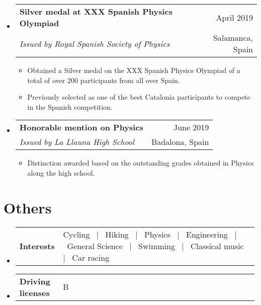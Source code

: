 \documentclass[a4paper,11pt]{article}
\makeatletter
\newcommand{\resumeSectionTypeOne}[2]{
  \item\begin{tabular*}{0.99\textwidth}[t]{
    p{0.18\linewidth}p{0.81\linewidth}
  }
  \textbf{#1} & #2
  \end{tabular*}\vspace{-2pt}
}
\newcommand{\resumeQuadHeading}[4]{
  \item
  \begin{tabular*}{0.96\textwidth}[t]{l@{\extracolsep{\fill}}r}
    \textbf{#1} & \small #2 \\
    \small#3 & \small #4 \\
  \end{tabular*}
}
\newcommand{\resumeHeadingListStart}{
  \begin{itemize}[leftmargin=0.15in, label={}]
}
\newcommand{\resumeHeadingListEnd}{\end{itemize}}
\makeatother
\begin{document}
\resumeHeadingListStart{}
\resumeQuadHeading{Silver medal at XXX Spanish Physics Olympiad}{April 2019}{\textit{Issued by Royal Spanish Society of Physics}}{Salamanca, Spain}
\begin{itemize}[leftmargin=3em, itemsep=0.1em, topsep=2pt]
  \item \small Obtained a Silver medal on the XXX Spanish Physics Olympiad of a total of over 200 participants from all over Spain.
  \item \small Previously selected as one of the best Catalonia participants to compete in the Spanish competition.
\end{itemize}
\resumeHeadingListEnd{}

\resumeHeadingListStart{}
\resumeQuadHeading{Honorable mention on Physics}{June 2019}{\textit{Issued by La Llauna High School}}{Badalona, Spain}
\begin{itemize}[leftmargin=3em, itemsep=0.1em, topsep=2pt]
  \item \small Distinction awarded based on the outstanding grades obtained in Physics along the high school.
\end{itemize}
\resumeHeadingListEnd{}

\section{Others}
\resumeHeadingListStart{}
\resumeSectionTypeOne{Interests}{Cycling \ $|$ \ Hiking  \ $|$ \ Physics  \ $|$ \ Engineering \ $|$ \ General Science \ $|$ \ Swimming \ $|$ \ Classical music \ $|$ \ Car racing}
\resumeHeadingListEnd{}

\resumeHeadingListStart{}
\resumeSectionTypeOne{Driving licenses}{B}
\resumeHeadingListEnd{}
\end{document}
